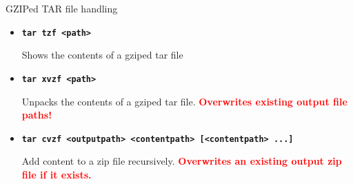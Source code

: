 \documentclass[aspectratio=1610]{beamer}
\newcommand\curtitle{}
\newenvironment{shells}[1]{
    \begin{tikzpicture}[codebox/.append style={text width=#1-18pt}]
        \coordinate (code);
}{
    \end{tikzpicture}
}
\newcommand\command[1]{\alert{\textbf{\texttt{#1}}}}
\begin{document}
\renewcommand\curtitle{GZIPed TAR file handling}

\begin{frame}[c]{\curtitle}
    \begin{itemize}[<+->]\setlength\itemsep{1em}
        \item \command{tar tzf <path>}

            Shows the contents of a gziped tar file
        \item \command{tar xvzf <path>}

            Unpacks the contents of a gziped tar file. \textcolor{red}{\textbf{Overwrites existing
            output file paths!}}
        \item \command{tar cvzf <outputpath> <contentpath> [<contentpath> ...]}

            Add content to a zip file recursively. \textcolor{red}{\textbf{Overwrites an existing
            output zip file if it exists.}}

    \end{itemize}
\end{frame}



\end{document}
